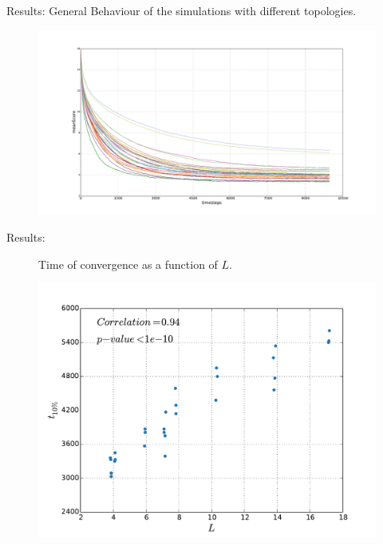 \documentclass[12pt, notes=show]{beamer}
\begin{document}
	\begin{frame}{Results: }
					General Behaviour of the simulations with different topologies.
		\begin{figure}[h]
			\begin{center}
						\includegraphics[height=.5\textheight]{images//provResults2.pdf}
			\end{center}
		\end{figure}

	\end{frame}

	\begin{frame}{Results: }
		\begin{figure}[h]

			Time of convergence as a function of $L$.
			\begin{center}
						\includegraphics[height=.6\textheight]{images//L_vs_t10.pdf}

			\end{center}
		\end{figure}

	\end{frame}
\end{document}
